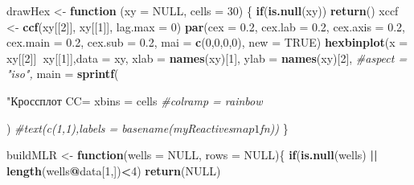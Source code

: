 \documentclass[]{article}
\newenvironment{Shaded}{\begin{snugshade}}{\end{snugshade}}
\newcommand{\KeywordTok}[1]{\textcolor[rgb]{0.13,0.29,0.53}{\textbf{#1}}}
\newcommand{\DataTypeTok}[1]{\textcolor[rgb]{0.13,0.29,0.53}{#1}}
\newcommand{\DecValTok}[1]{\textcolor[rgb]{0.00,0.00,0.81}{#1}}
\newcommand{\FloatTok}[1]{\textcolor[rgb]{0.00,0.00,0.81}{#1}}
\newcommand{\StringTok}[1]{\textcolor[rgb]{0.31,0.60,0.02}{#1}}
\newcommand{\CommentTok}[1]{\textcolor[rgb]{0.56,0.35,0.01}{\textit{#1}}}
\newcommand{\OtherTok}[1]{\textcolor[rgb]{0.56,0.35,0.01}{#1}}
\newcommand{\ControlFlowTok}[1]{\textcolor[rgb]{0.13,0.29,0.53}{\textbf{#1}}}
\newcommand{\OperatorTok}[1]{\textcolor[rgb]{0.81,0.36,0.00}{\textbf{#1}}}
\newcommand{\NormalTok}[1]{#1}
\begin{document}
\begin{Shaded}
\begin{Highlighting}[]
{{{{\NormalTok{drawHex <-}\StringTok{ }\ControlFlowTok{function}\NormalTok{ (}\DataTypeTok{xy =} \OtherTok{NULL}\NormalTok{, }\DataTypeTok{cells =} \DecValTok{30}\NormalTok{) \{}
  \ControlFlowTok{if}\NormalTok{(}\KeywordTok{is.null}\NormalTok{(xy)) }
    \KeywordTok{return}\NormalTok{()}
\NormalTok{  xccf <-}\StringTok{ }\KeywordTok{ccf}\NormalTok{(xy[[}\DecValTok{2}\NormalTok{]], xy[[}\DecValTok{1}\NormalTok{]], }\DataTypeTok{lag.max =} \DecValTok{0}\NormalTok{)}
  \KeywordTok{par}\NormalTok{(}\DataTypeTok{cex =} \FloatTok{0.2}\NormalTok{,}
      \DataTypeTok{cex.lab =} \FloatTok{0.2}\NormalTok{,}
      \DataTypeTok{cex.axis =} \FloatTok{0.2}\NormalTok{,}
      \DataTypeTok{cex.main =} \FloatTok{0.2}\NormalTok{,}
      \DataTypeTok{cex.sub =} \FloatTok{0.2}\NormalTok{,}
      \DataTypeTok{mai =} \KeywordTok{c}\NormalTok{(}\DecValTok{0}\NormalTok{,}\DecValTok{0}\NormalTok{,}\DecValTok{0}\NormalTok{,}\DecValTok{0}\NormalTok{),}
      \DataTypeTok{new =} \OtherTok{TRUE}\NormalTok{)}
  \KeywordTok{hexbinplot}\NormalTok{(}\DataTypeTok{x =}\NormalTok{ xy[[}\DecValTok{2}\NormalTok{]]}\OperatorTok{~}\NormalTok{xy[[}\DecValTok{1}\NormalTok{]],}\DataTypeTok{data =}\NormalTok{ xy,}
             \DataTypeTok{xlab =} \KeywordTok{names}\NormalTok{(xy)[}\DecValTok{1}\NormalTok{],}
             \DataTypeTok{ylab =} \KeywordTok{names}\NormalTok{(xy)[}\DecValTok{2}\NormalTok{],}
             \CommentTok{#aspect = "iso",}
             \DataTypeTok{main =} \KeywordTok{sprintf}\NormalTok{(}\StringTok{"Кроссплот CC=%5.2f %s=%5.2f"}\NormalTok{, xccf}\OperatorTok{$}\NormalTok{acf, }\KeywordTok{parse}\NormalTok{(}\DataTypeTok{text =} \StringTok{'R^2'}\NormalTok{), }\KeywordTok{as.numeric}\NormalTok{(xccf}\OperatorTok{$}\NormalTok{acf) }\OperatorTok{^}\StringTok{ }\DecValTok{2}\NormalTok{),}
             \DataTypeTok{xbins =}\NormalTok{ cells}
             \CommentTok{#colramp = rainbow}
             
\NormalTok{  )}
  \CommentTok{#text(c(1,1),labels = basename(myReactives$map1$fn))}
\NormalTok{\}}

\NormalTok{buildMLR <-}\StringTok{ }\ControlFlowTok{function}\NormalTok{(}\DataTypeTok{wells =} \OtherTok{NULL}\NormalTok{, }\DataTypeTok{rows =} \OtherTok{NULL}\NormalTok{)\{}
  \ControlFlowTok{if}\NormalTok{(}\KeywordTok{is.null}\NormalTok{(wells) }\OperatorTok{||}\StringTok{ }\KeywordTok{length}\NormalTok{(wells}\OperatorTok{@}\NormalTok{data[}\DecValTok{1}\NormalTok{,])}\OperatorTok{<}\DecValTok{4}\NormalTok{) }\KeywordTok{return}\NormalTok{(}\OtherTok{NULL}\NormalTok{)}
  
}}}}}
\end{Highlighting}
\end{Shaded}
\end{document}
